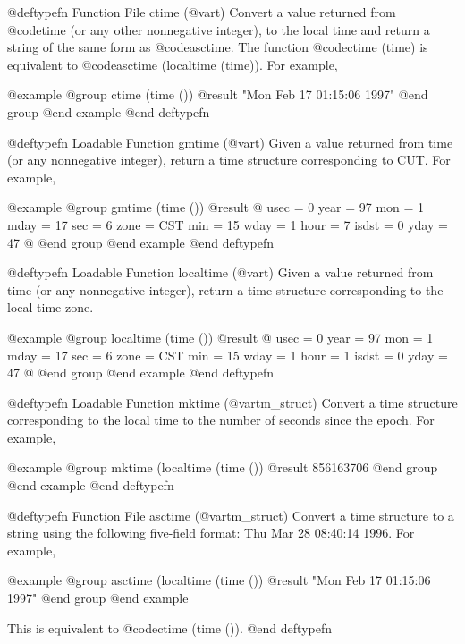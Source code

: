 @deftypefn {Function File} {} ctime (@var{t})
Convert a value returned from @code{time} (or any other nonnegative
integer), to the local time and return a string of the same form as
@code{asctime}.  The function @code{ctime (time)} is equivalent to
@code{asctime (localtime (time))}.  For example,

@example
@group
ctime (time ())
     @result{} "Mon Feb 17 01:15:06 1997"
@end group
@end example
@end deftypefn

@deftypefn {Loadable Function} {} gmtime (@var{t})
Given a value returned from time (or any nonnegative integer),
return a time structure corresponding to CUT.  For example,

@example
@group
gmtime (time ())
     @result{} @{
           usec = 0
           year = 97
           mon = 1
           mday = 17
           sec = 6
           zone = CST
           min = 15
           wday = 1
           hour = 7
           isdst = 0
           yday = 47
         @}
@end group
@end example
@end deftypefn

@deftypefn {Loadable Function} {} localtime (@var{t})
Given a value returned from time (or any nonnegative integer),
return a time structure corresponding to the local time zone.

@example
@group
localtime (time ())
     @result{} @{
           usec = 0
           year = 97
           mon = 1
           mday = 17
           sec = 6
           zone = CST
           min = 15
           wday = 1
           hour = 1
           isdst = 0
           yday = 47
         @}
@end group
@end example
@end deftypefn

@deftypefn {Loadable Function} {} mktime (@var{tm_struct})
Convert a time structure corresponding to the local time to the number
of seconds since the epoch.  For example,

@example
@group
mktime (localtime (time ())
     @result{} 856163706
@end group
@end example
@end deftypefn

@deftypefn {Function File} {} asctime (@var{tm_struct})
Convert a time structure to a string using the following five-field
format: Thu Mar 28 08:40:14 1996.  For example,

@example
@group
asctime (localtime (time ())
     @result{} "Mon Feb 17 01:15:06 1997\n"
@end group
@end example

This is equivalent to @code{ctime (time ())}.
@end deftypefn

